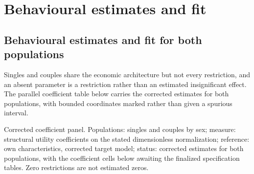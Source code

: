 \documentclass[11pt,a4paper]{article}
\begin{document}
\section{Behavioural estimates and fit}\label{behavioural-estimates-and-fit}

\subsection{Behavioural estimates and fit for both populations}\label{behavioural-estimates-and-fit-for-both-populations}

Singles and couples share the economic architecture but not every restriction, and an absent parameter is a restriction rather than an estimated insignificant effect. The parallel coefficient table below carries the corrected estimates for both populations, with bounded coordinates marked rather than given a spurious interval.

Corrected coefficient panel. Populations: singles and couples by sex; measure: structural utility coefficients on the stated dimensionless normalization; reference: own characteristics, corrected target model; status: corrected estimates for both populations, with the coefficient cells below awaiting the finalized specification tables. Zero restrictions are not estimated zeros.
\end{document}
